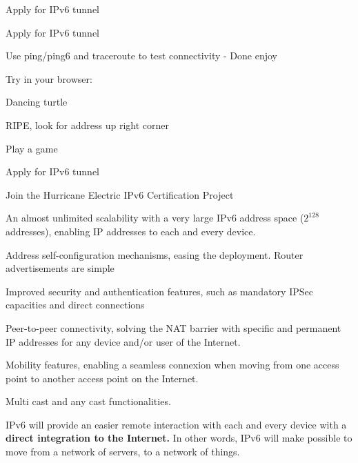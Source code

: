 \documentclass[28pt,landscape,a4paper,footrule]{foils}
\begin{document}
\begin{list1}
\item {} Apply for IPv6 tunnel 
\item {} Apply for IPv6 tunnel 
\item Use ping/ping6 and traceroute to test connectivity - Done enjoy \smiley
\item Try in your browser:
\begin{list2}
\item {} Dancing turtle
\item {} RIPE, look for address up right corner 
\item {} Play a game
\item {} Apply for IPv6 tunnel 
\item {} Join the Hurricane Electric IPv6 Certification Project
\end{list2}
\end{list1}







\begin{list2}
\item An almost unlimited scalability with a very large IPv6 address space ($2^{128}$ addresses), enabling IP addresses to each and every device.

\item Address self-configuration mechanisms, easing the deployment. Router advertisements are simple

\item Improved security and authentication features, such as mandatory IPSec capacities and direct connections

\item Peer-to-peer connectivity, solving the NAT barrier with specific and permanent IP addresses for any device and/or user of the Internet.

\item Mobility features, enabling a seamless connexion when moving from one access point to another access point on the Internet.

\item Multi cast and any cast functionalities.

\item IPv6 will provide an easier remote interaction with each and every device with a {\bfseries direct integration to the Internet.} In other words, IPv6 will make possible to move from a network of servers, to a network of things.

\end{list2}
\end{document}
